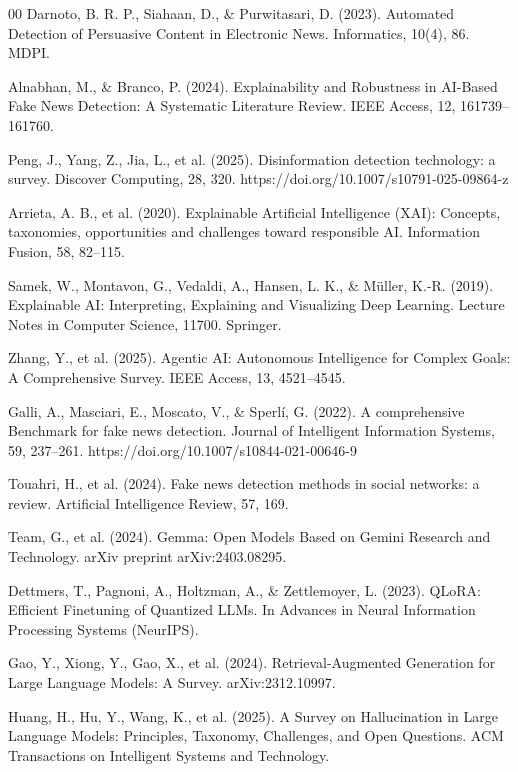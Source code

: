 \documentclass{ieeeaccess}
\begin{document}
\begin{thebibliography}{00}
 Darnoto, B. R. P., Siahaan, D., \& Purwitasari, D. (2023). Automated Detection of Persuasive Content in Electronic News. Informatics, 10(4), 86. MDPI.

 Alnabhan, M., \& Branco, P. (2024). Explainability and Robustness in AI-Based Fake News Detection: A Systematic Literature Review. IEEE Access, 12, 161739--161760.

 Peng, J., Yang, Z., Jia, L., et al. (2025). Disinformation detection technology: a survey. Discover Computing, 28, 320. https://doi.org/10.1007/s10791-025-09864-z

 Arrieta, A. B., et al. (2020). Explainable Artificial Intelligence (XAI): Concepts, taxonomies, opportunities and challenges toward responsible AI. Information Fusion, 58, 82--115.

 Samek, W., Montavon, G., Vedaldi, A., Hansen, L. K., \& Müller, K.-R. (2019). Explainable AI: Interpreting, Explaining and Visualizing Deep Learning. Lecture Notes in Computer Science, 11700. Springer.

 Zhang, Y., et al. (2025). Agentic AI: Autonomous Intelligence for Complex Goals: A Comprehensive Survey. IEEE Access, 13, 4521--4545.

 Galli, A., Masciari, E., Moscato, V., \& Sperlí, G. (2022). A comprehensive Benchmark for fake news detection. Journal of Intelligent Information Systems, 59, 237--261. https://doi.org/10.1007/s10844-021-00646-9

 Touahri, H., et al. (2024). Fake news detection methods in social networks: a review. Artificial Intelligence Review, 57, 169.

 Team, G., et al. (2024). Gemma: Open Models Based on Gemini Research and Technology. arXiv preprint arXiv:2403.08295.

 Dettmers, T., Pagnoni, A., Holtzman, A., \& Zettlemoyer, L. (2023). QLoRA: Efficient Finetuning of Quantized LLMs. In Advances in Neural Information Processing Systems (NeurIPS).

 Gao, Y., Xiong, Y., Gao, X., et al. (2024). Retrieval-Augmented Generation for Large Language Models: A Survey. arXiv:2312.10997.

 Huang, H., Hu, Y., Wang, K., et al. (2025). A Survey on Hallucination in Large Language Models: Principles, Taxonomy, Challenges, and Open Questions. ACM Transactions on Intelligent Systems and Technology.


\end{thebibliography}
\end{document}
